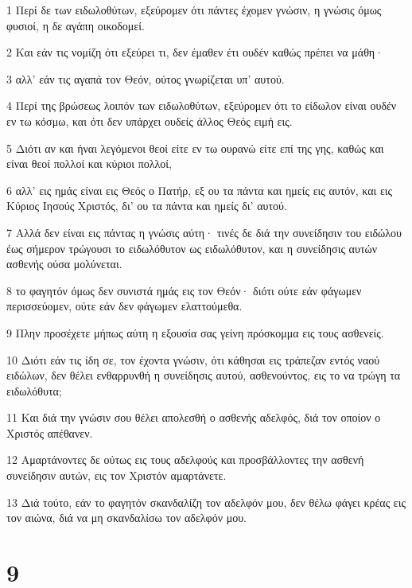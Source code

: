 \par 1 Περί δε των ειδωλοθύτων, εξεύρομεν ότι πάντες έχομεν γνώσιν, η γνώσις όμως φυσιοί, η δε αγάπη οικοδομεί.
\par 2 Και εάν τις νομίζη ότι εξεύρει τι, δεν έμαθεν έτι ουδέν καθώς πρέπει να μάθη·
\par 3 αλλ' εάν τις αγαπά τον Θεόν, ούτος γνωρίζεται υπ' αυτού.
\par 4 Περί της βρώσεως λοιπόν των ειδωλοθύτων, εξεύρομεν ότι το είδωλον είναι ουδέν εν τω κόσμω, και ότι δεν υπάρχει ουδείς άλλος Θεός ειμή εις.
\par 5 Διότι αν και ήναι λεγόμενοι θεοί είτε εν τω ουρανώ είτε επί της γης, καθώς και είναι θεοί πολλοί και κύριοι πολλοί,
\par 6 αλλ' εις ημάς είναι εις Θεός ο Πατήρ, εξ ου τα πάντα και ημείς εις αυτόν, και εις Κύριος Ιησούς Χριστός, δι' ου τα πάντα και ημείς δι' αυτού.
\par 7 Αλλά δεν είναι εις πάντας η γνώσις αύτη· τινές δε διά την συνείδησιν του ειδώλου έως σήμερον τρώγουσι το ειδωλόθυτον ως ειδωλόθυτον, και η συνείδησις αυτών ασθενής ούσα μολύνεται.
\par 8 το φαγητόν όμως δεν συνιστά ημάς εις τον Θεόν· διότι ούτε εάν φάγωμεν περισσεύομεν, ούτε εάν δεν φάγωμεν ελαττούμεθα.
\par 9 Πλην προσέχετε μήπως αύτη η εξουσία σας γείνη πρόσκομμα εις τους ασθενείς.
\par 10 Διότι εάν τις ίδη σε, τον έχοντα γνώσιν, ότι κάθησαι εις τράπεζαν εντός ναού ειδώλων, δεν θέλει ενθαρρυνθή η συνείδησις αυτού, ασθενούντος, εις το να τρώγη τα ειδωλόθυτα;
\par 11 Και διά την γνώσιν σου θέλει απολεσθή ο ασθενής αδελφός, διά τον οποίον ο Χριστός απέθανεν.
\par 12 Αμαρτάνοντες δε ούτως εις τους αδελφούς και προσβάλλοντες την ασθενή συνείδησιν αυτών, εις τον Χριστόν αμαρτάνετε.
\par 13 Διά τούτο, εάν το φαγητόν σκανδαλίζη τον αδελφόν μου, δεν θέλω φάγει κρέας εις τον αιώνα, διά να μη σκανδαλίσω τον αδελφόν μου.

\chapter{9}

